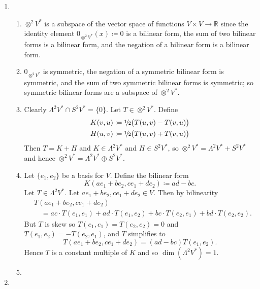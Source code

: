 \documentclass[a4paper, 12pt]{article}
\newcommand{\R}{\mathbb{R}}
\newcommand{\half}{\sfrac{1\!}2}
\begin{document}
\begin{enumerate}

\item \begin{enumerate}

\item \(\otimes^2V^*\) is a subspace of the vector space of functions \(V\times V\to\R\) since the identity element \(0_{\otimes^2V^*}(x)\coloneqq0\) is a bilinear form, the sum of two bilinear forms is a bilinear form, and the negation of a bilinear form is a bilinear form.

\item \(0_{\otimes^2V^*}\) is symmetric, the negation of a symmetric bilinear form is symmetric, and the sum of two symmetric bilinear forms is symmetric; so symmetric bilinear forms are a subspace of \(\otimes^2V^*\).

\item Clearly \(\Lambda^2V^*\cap S^2V^*=\{0\}\). Let \(T\in\otimes^2V^*\). Define
\begin{gather*}
K(v,u)\coloneqq\half\big(T(u,v)-T(v,u)\big)\\
H(u,v)\coloneqq\half\big(T(u,v)+T(v,u)\big)
\end{gather*}
Then \(T=K+H\) and \(K\in\Lambda^2V^*\) and \(H\in S^2V^*\), so \(\otimes^2V^*=\Lambda^2V^*+S^2V^*\) and hence \(\otimes^2V^*=\Lambda^2V^*\oplus S^2V^*\).

\item Let \(\{e_1,e_2\}\) be a basis for \(V\). Define the bilinear form
\[K(ae_1+be_2,ce_1+de_2)\coloneqq ad-bc.\]
Let \(T\in\Lambda^2V^*\). Let \(ae_1+be_2,ce_1+de_2\in V\). Then by bilinearity
\begin{align*}
&T(ae_1+be_2,ce_1+de_2)\\
&\quad=ac\cdot T(e_1,e_1)+ad\cdot T(e_1,e_2)+bc\cdot T(e_2,e_1)+bd\cdot T(e_2,e_2).
\end{align*}
But \(T\) is skew so \(T(e_1,e_1)=T(e_2,e_2)=0\) and \(T(e_1,e_2)=-T(e_2,e_1)\), and \(T\) simplifies to
\[T(ae_1+be_2,ce_1+de_2)=(ad-bc)T(e_1,e_2).\]
Hence \(T\) is a constant multiple of \(K\) and so \(\dim(\Lambda^2V^*)=1\).
\item

\end{enumerate}

\item \begin{enumerate}


\end{enumerate}
\end{enumerate}
\end{document}
